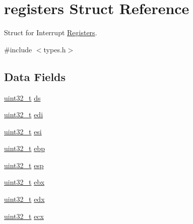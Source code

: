\hypertarget{a00252}{}\section{registers Struct Reference}
\label{a00252}


Struct for Interrupt \hyperlink{a00248}{Registers}.  




{\ttfamily \#include $<$types.\+h$>$}

\subsection*{Data Fields}
\begin{DoxyCompactItemize}
\item 
\hyperlink{a00134_a435d1572bf3f880d55459d9805097f62_a435d1572bf3f880d55459d9805097f62}{uint32\+\_\+t} \hyperlink{a00252_a806ec3ba0cf965d456601aea4c039ec3_a806ec3ba0cf965d456601aea4c039ec3}{ds}
\item 
\hyperlink{a00134_a435d1572bf3f880d55459d9805097f62_a435d1572bf3f880d55459d9805097f62}{uint32\+\_\+t} \hyperlink{a00252_aeedcb447fe6640d43d09c27b7cb8db3b_aeedcb447fe6640d43d09c27b7cb8db3b}{edi}
\item 
\hyperlink{a00134_a435d1572bf3f880d55459d9805097f62_a435d1572bf3f880d55459d9805097f62}{uint32\+\_\+t} \hyperlink{a00252_a8da011d75d93d36da6c4cf28e1fa3179_a8da011d75d93d36da6c4cf28e1fa3179}{esi}
\item 
\hyperlink{a00134_a435d1572bf3f880d55459d9805097f62_a435d1572bf3f880d55459d9805097f62}{uint32\+\_\+t} \hyperlink{a00252_a8d156d1d27fcb1c2f2bbcce1a784431f_a8d156d1d27fcb1c2f2bbcce1a784431f}{ebp}
\item 
\hyperlink{a00134_a435d1572bf3f880d55459d9805097f62_a435d1572bf3f880d55459d9805097f62}{uint32\+\_\+t} \hyperlink{a00252_a9cc3091e4c0f25d142ac74443dc8d384_a9cc3091e4c0f25d142ac74443dc8d384}{esp}
\item 
\hyperlink{a00134_a435d1572bf3f880d55459d9805097f62_a435d1572bf3f880d55459d9805097f62}{uint32\+\_\+t} \hyperlink{a00252_aa8989b2fef42dca1d656f724eb324f51_aa8989b2fef42dca1d656f724eb324f51}{ebx}
\item 
\hyperlink{a00134_a435d1572bf3f880d55459d9805097f62_a435d1572bf3f880d55459d9805097f62}{uint32\+\_\+t} \hyperlink{a00252_af3b40afa73ecdaf2c9279b9ed482d26b_af3b40afa73ecdaf2c9279b9ed482d26b}{edx}
\item 
\hyperlink{a00134_a435d1572bf3f880d55459d9805097f62_a435d1572bf3f880d55459d9805097f62}{uint32\+\_\+t} \hyperlink{a00252_a00ce491148fd90800c18bd2d4c22e090_a00ce491148fd90800c18bd2d4c22e090}{ecx}

\end{DoxyCompactItemize}

